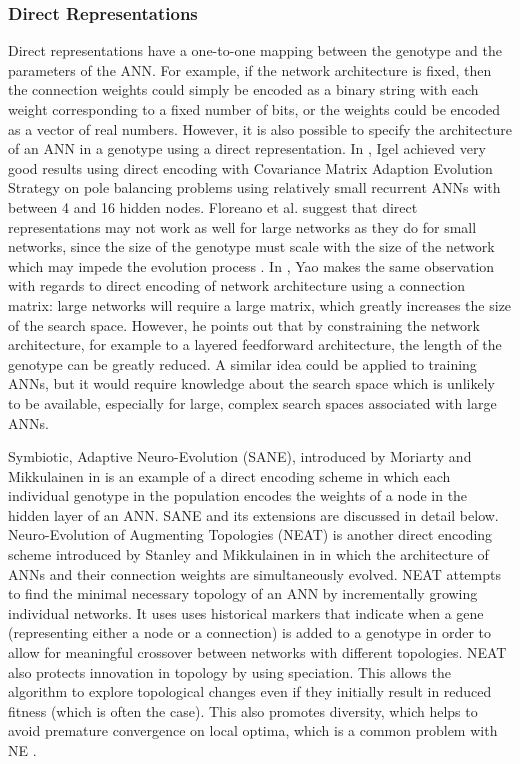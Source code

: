 \documentclass[12pt]{article} %
\begin{document}
\subsubsection{Direct Representations}

Direct representations have a one-to-one mapping between the genotype and the parameters of the ANN. For example, if the network architecture is fixed, then the connection weights could simply be encoded as a binary string with each weight corresponding to a fixed number of bits, or the weights could be encoded as a vector of real numbers. However, it is also possible to specify the architecture of an ANN in a genotype using a direct representation. In \cite{Igel2003}, Igel achieved very good results using direct encoding with Covariance Matrix Adaption Evolution Strategy on pole balancing problems using relatively small recurrent ANNs with between 4 and 16 hidden nodes. Floreano et al. suggest that direct representations may not work as well for large networks as they do for small networks, since the size of the genotype must scale with the size of the network which may impede the evolution process \cite{Floreano2008}. In \cite{Yao1999}, Yao makes the same observation with regards to direct encoding of network architecture using a connection matrix: large networks will require a large matrix, which greatly increases the size of the search space. However, he points out that by constraining the network architecture, for example to a layered feedforward architecture, the length of the genotype can be greatly reduced. A similar idea could be applied to training ANNs, but it would require knowledge about the search space which is unlikely to be available, especially for large, complex search spaces associated with large ANNs.

Symbiotic, Adaptive Neuro-Evolution (SANE), introduced by Moriarty and Mikkulainen in \cite{Moriarty1996} is an example of a direct encoding scheme in which each individual genotype in the population encodes the weights of a node in the hidden layer of an ANN. SANE and its extensions are discussed in detail below. Neuro-Evolution of Augmenting Topologies (NEAT) is another direct encoding scheme introduced by Stanley and Mikkulainen in \cite{Stanley2002} in which the architecture of ANNs and their connection weights are simultaneously evolved. NEAT attempts to find the minimal necessary topology of an ANN by incrementally growing individual networks. It uses uses historical markers that indicate when a gene (representing either a node or a connection) is added to a genotype in order to allow for meaningful crossover between networks with different topologies. NEAT also protects innovation in topology by using speciation. This allows the algorithm to explore topological changes even if they initially result in reduced fitness (which is often the case). This also promotes diversity, which helps to avoid premature convergence on local optima, which is a common problem with NE \cite{Floreano2008}\cite{Moriarty1996}. 
\end{document}
